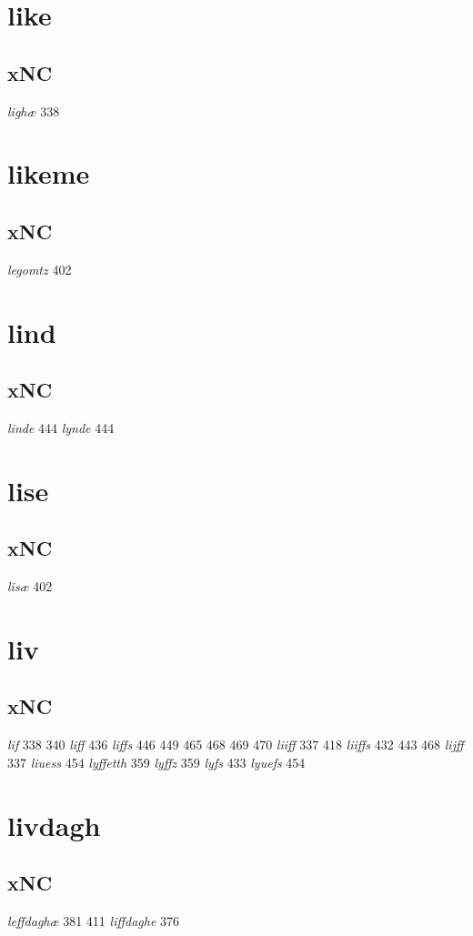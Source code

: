 \documentclass[a4paper,twocolumn]{article}
\begin{document}
\section{like}
\label{sec:orgc8c23ed}
\subsection{xNC}
\label{sec:orgffce64c}
\emph{lighæ} 338 
\section{likeme}
\label{sec:org3855d81}
\subsection{xNC}
\label{sec:org4b6001d}
\emph{legomtz} 402 
\section{lind}
\label{sec:org8c3e5f4}
\subsection{xNC}
\label{sec:orgdcb6238}
\emph{linde} 444 \emph{lynde} 444 
\section{lise}
\label{sec:org8e9b27a}
\subsection{xNC}
\label{sec:org94dbdbc}
\emph{lisæ} 402 
\section{liv}
\label{sec:org743fd64}
\subsection{xNC}
\label{sec:org049c276}
\emph{lif} 338 340 \emph{liff} 436 \emph{liffs} 446 449 465 468 469 470 \emph{liiff} 337 418 \emph{liiffs} 432 443 468 \emph{lijff} 337 \emph{liuess} 454 \emph{lyffetth} 359 \emph{lyffz} 359 \emph{lyfs} 433 \emph{lyuefs} 454 
\section{livdagh}
\label{sec:orgef143d6}
\subsection{xNC}
\label{sec:org9495d0b}
\emph{leffdaghæ} 381 411 \emph{liffdaghe} 376 
\end{document}
